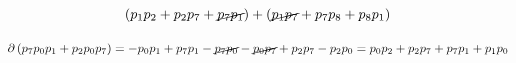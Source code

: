   \begin{equation}
    \left( p_1 p_2+p_2 p_7 + \cancel{p_7 p_1} \right) + \left( \cancel{p_1 p_7} + p_7 p_8 + p_8 p_1 \right)
  \end{equation}


  \begin{equation}
    \partial \left( p_7 p_0 p_1 + p_2 p_0 p_7 \right)
    =  - p_0 p_1 + p_7 p_1 - \cancel{p_7 p_0} - \cancel{p_0 p_7} + p_2 p_7 - p_2 p_0
    = p_0 p_2 + p_2 p_7 + p_7 p_1 + p_1 p_0
  \end{equation}
